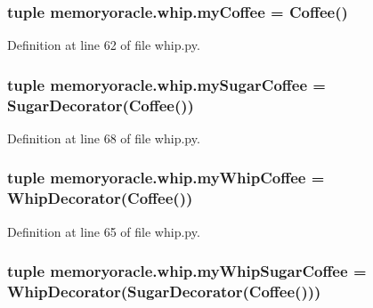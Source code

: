 \subsubsection[{my\+Coffee}]{\setlength{\rightskip}{0pt plus 5cm}tuple memoryoracle.\+whip.\+my\+Coffee = {\bf Coffee}()}\label{namespacememoryoracle_1_1whip_a699c7d4f532bf531884c1b8d63e3c54a}


Definition at line 62 of file whip.\+py.

\hypertarget{namespacememoryoracle_1_1whip_a5499987513ec35b1d99b12773c508c06}{}
\subsubsection[{my\+Sugar\+Coffee}]{\setlength{\rightskip}{0pt plus 5cm}tuple memoryoracle.\+whip.\+my\+Sugar\+Coffee = {\bf Sugar\+Decorator}({\bf Coffee}())}\label{namespacememoryoracle_1_1whip_a5499987513ec35b1d99b12773c508c06}


Definition at line 68 of file whip.\+py.

\hypertarget{namespacememoryoracle_1_1whip_a02937cc57ed7ecd4a098d2ff3c169f41}{}
\subsubsection[{my\+Whip\+Coffee}]{\setlength{\rightskip}{0pt plus 5cm}tuple memoryoracle.\+whip.\+my\+Whip\+Coffee = {\bf Whip\+Decorator}({\bf Coffee}())}\label{namespacememoryoracle_1_1whip_a02937cc57ed7ecd4a098d2ff3c169f41}


Definition at line 65 of file whip.\+py.

\hypertarget{namespacememoryoracle_1_1whip_ad09a6bd0136da3334447b1700114201c}{}
\subsubsection[{my\+Whip\+Sugar\+Coffee}]{\setlength{\rightskip}{0pt plus 5cm}tuple memoryoracle.\+whip.\+my\+Whip\+Sugar\+Coffee = {\bf Whip\+Decorator}({\bf Sugar\+Decorator}({\bf Coffee}()))}\label{namespacememoryoracle_1_1whip_ad09a6bd0136da3334447b1700114201c}


